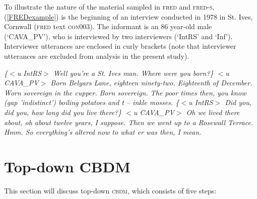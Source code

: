 \documentclass[output=paper]{LSP/langsci}
\begin{document}
To illustrate the nature of the material sampled in \textsc{fred} and \textsc{fred-s}, (\ref{FREDexample}) is the beginning of an interview conducted in 1978 in St. Ives, Cornwall (\textsc{fred} text \textsc{con}003). The informant is an 86 year-old male (`CAVA\_PV'), who is interviewed by two interviewers (`IntRS' and `Inf'). Interviewer utterances are enclosed in curly brackets (note that interviewer utterances are excluded from analysis in the present study).

\newpage
\begin{exe}
\ex \label{FREDexample} \textit{\{$<$u IntRS$>$ Well you're a St. Ives man. Where were you born?\}
\newline$<$u CAVA\_PV$>$ Born Belyars Lane, eighteen ninety-two. Eighteenth of December. Worn sovereign in the cupper. Born sovereign. The poor times then, you know (gap 'indistinct') boiling potatoes and t -- inkle mosses.
\newline\{$<$u IntRS$>$ Did you, did you, how long did you live there?\}
\newline$<$u CAVA\_PV$>$ Oh we lived there about, oh about twelve years, I suppose. Then we went up to a Rosewall Terrace. Hmm. So everything's altered now to what er was then, I mean.}
\end{exe}

\section{Top-down CBDM} \label{topdown}

This section will discuss top-down \textsc{cbdm}, which consists of five steps:
\end{document}
